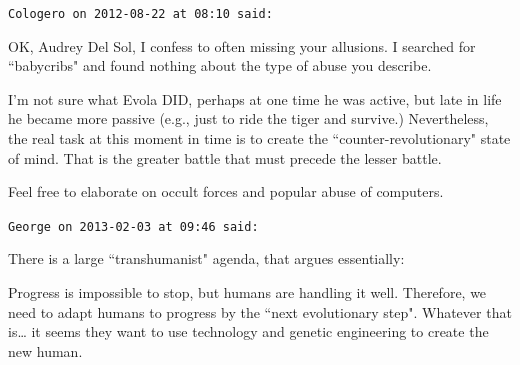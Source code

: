 \begin{footnotesize}
\begin{sffamily}
\hfill

\texttt{Cologero on 2012-08-22 at 08:10 said: }

OK, Audrey Del Sol, I confess to often missing your allusions. I searched for ``babycribs" and found nothing about the type of abuse you describe.

I'm not sure what Evola DID, perhaps at one time he was active, but late in life he became more passive (e.g., just to ride the tiger and survive.) Nevertheless, the real task at this moment in time is to create the ``counter-revolutionary" state of mind. That is the greater battle that must precede the lesser battle. 

Feel free to elaborate on occult forces and popular abuse of computers.


\hfill

\texttt{George on 2013-02-03 at 09:46 said: }

There is a large ``transhumanist" agenda, that argues essentially:

Progress is impossible to stop, but humans are handling it well. Therefore, we need to adapt humans to progress by the ``next evolutionary step". Whatever that is… it seems they want to use technology and genetic engineering to create the new human.


\end{sffamily}\end{footnotesize}
